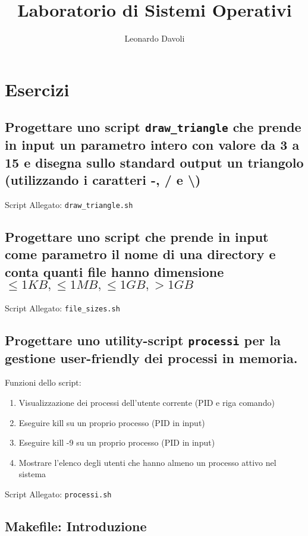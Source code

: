 \documentclass{article}
\author{Leonardo Davoli}
\title{Laboratorio di Sistemi Operativi}
\begin{document}
\maketitle

\setcounter{section}{3} %
\section{Esercizi}

\subsection{Progettare uno script \texttt{draw\_triangle} che prende in input un parametro intero con valore da 3 a 15 
e disegna sullo standard output un triangolo (utilizzando i caratteri -, / e \textbackslash)}

Script Allegato: \texttt{draw\_triangle.sh}

\subsection{Progettare uno script che prende in input come para\-metro il nome di una directory e conta quanti file hanno dimensione 
$\leq 1KB, \leq 1MB, \leq 1GB, > 1GB$}

Script Allegato: \texttt{file\_sizes.sh}

\subsection{Progettare uno utility-script \texttt{processi} per la gestione user-friendly dei processi in memoria.}

Funzioni dello script:
\begin{enumerate}
    \item Visualizzazione dei processi dell'utente corrente (PID e riga comando)
    \item Eseguire kill su un proprio processo (PID in input)
    \item Eseguire kill -9 su un proprio processo (PID in input)
    \item Mostrare l'elenco degli utenti che hanno almeno un processo attivo nel sistema
\end{enumerate}

Script Allegato: \texttt{processi.sh}

\subsection{Makefile: Introduzione}
\end{document}
